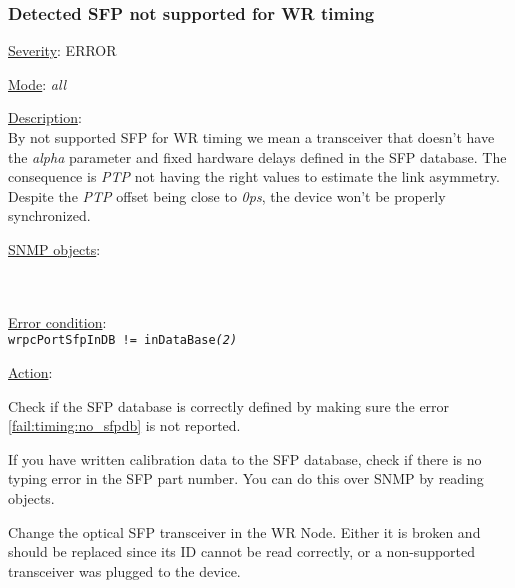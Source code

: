 \subsubsection{\bf Detected SFP not supported for WR timing}
		\label{fail:timing:wrong_sfp}
		\begin{pck_descr}
			\item [] \underline{Severity}: ERROR
			\item [] \underline{Mode}: \emph{all}
			\item [] \underline{Description}:\\
				By not supported SFP for WR timing we mean a transceiver that doesn't
				have the \emph{alpha} parameter and fixed hardware delays defined in the
				SFP database. The consequence is \emph{PTP} not having the right
				values to estimate the link asymmetry. Despite the \emph{PTP} offset
        being close to \emph{0ps}, the device won't be properly synchronized.
			\item [] \underline{SNMP objects}:\\
				{\footnotesize
				\\
				\\
         }
			\item [] \underline{Error condition}:\\
				{\footnotesize
        \texttt{wrpcPortSfpInDB != inDataBase\emph{(2)}} }
      \item [] \underline{Action}:
        \begin{pck_proc}
        \item Check if the SFP database is correctly defined by making sure the
          error \ref{fail:timing:no_sfpdb} is not reported.
        \item If you have written calibration data to the SFP database, check if
          there is no typing error in the SFP part number. You can do this over
          SNMP by reading  objects.
        \item Change the optical SFP transceiver in the WR Node. Either it is
          broken and should be replaced since its ID cannot be read correctly,
          or a non-supported transceiver was plugged to the device.
        \end{pck_proc}
		\end{pck_descr}

